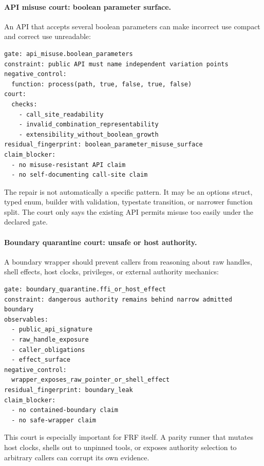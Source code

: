 \documentclass[11pt,a4paper]{article}
\newcommand{\frf}{\textsc{FRF}}
\begin{document}
\paragraph{API misuse court: boolean parameter surface.}
An API that accepts several boolean parameters can make incorrect use compact and correct use unreadable:
\begin{verbatim}
gate: api_misuse.boolean_parameters
constraint: public API must name independent variation points
negative_control:
  function: process(path, true, false, true, false)
court:
  checks:
    - call_site_readability
    - invalid_combination_representability
    - extensibility_without_boolean_growth
residual_fingerprint: boolean_parameter_misuse_surface
claim_blocker:
  - no misuse-resistant API claim
  - no self-documenting call-site claim
\end{verbatim}
The repair is not automatically a specific pattern. It may be an options struct, typed enum, builder with validation, typestate transition, or narrower function split. The court only says the existing API permits misuse too easily under the declared gate.

\paragraph{Boundary quarantine court: unsafe or host authority.}
A boundary wrapper should prevent callers from reasoning about raw handles, shell effects, host clocks, privileges, or external authority mechanics:
\begin{verbatim}
gate: boundary_quarantine.ffi_or_host_effect
constraint: dangerous authority remains behind narrow admitted boundary
observables:
  - public_api_signature
  - raw_handle_exposure
  - caller_obligations
  - effect_surface
negative_control:
  wrapper_exposes_raw_pointer_or_shell_effect
residual_fingerprint: boundary_leak
claim_blocker:
  - no contained-boundary claim
  - no safe-wrapper claim
\end{verbatim}
This court is especially important for \frf{} itself. A parity runner that mutates host clocks, shells out to unpinned tools, or exposes authority selection to arbitrary callers can corrupt its own evidence.
\end{document}

